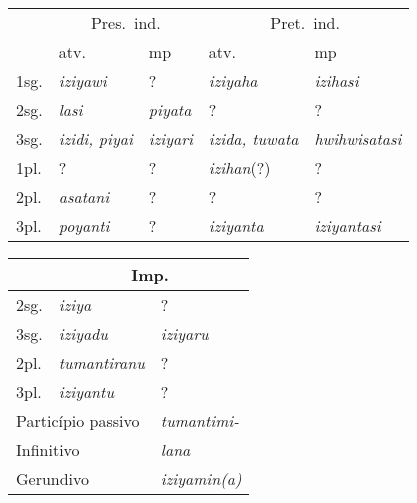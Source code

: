 \begin{center}
	\begin{tabular}[c]{lll|ll}
		\toprule
		     & \multicolumn{2}{c|}{Pres.\ ind.} & \multicolumn{2}{c}{Pret.\ ind.}                                              \\

		     & atv.\emph{}                      & mp\emph{}
		     & atv.\emph{}                      & mp\emph{}                                                                    \\
		\midrule
		1sg. & \emph{iziyawi}                   & {?}\emph{}                      & \emph{iziyaha}       & \emph{izihasi}      \\
		2sg. & \emph{lasi}                      & \emph{piyata}                   & {?}\emph{}           & {?}                 \\
		3sg. & \emph{izidi, piyai}              & \emph{iziyari}                  & \emph{izida, tuwata} & \emph{hwihwisatasi} \\
		1pl. & {?}                              & {?}                             & \emph{izihan}{(?)}   & {?}                 \\
		2pl. & \emph{asatani}                   & {?}                             & {?}                  & {?}                 \\
		3pl. & \emph{poyanti}                   & {?}                             & \emph{iziyanta}      & \emph{iziyantasi}   \\
		\bottomrule
	\end{tabular}
\end{center}


\begin{center}
	\begin{tabular}[c]{lll}
		\toprule
		                                        & \multicolumn{2}{c}{Imp.}                  \\
		\midrule
		2sg.                                    & \emph{iziya}             & {?}            \\
		3sg.                                    & \emph{iziyadu}           & \emph{iziyaru} \\
		2pl.                                    & \emph{tumantiranu}       & {?}            \\
		3pl.                                    & \emph{iziyantu}          & {?}            \\
		\midrule
		\midrule
		\multicolumn{2}{l}{Particípio  passivo} & {\emph{tumantimi-}}                       \\
		\multicolumn{2}{l}{Infinitivo}          & {\emph{lana}}                             \\
		\multicolumn{2}{l}{Gerundivo}           & {\emph{iziyamin{(a)}}}                    \\
		\bottomrule
	\end{tabular}
\end{center}

